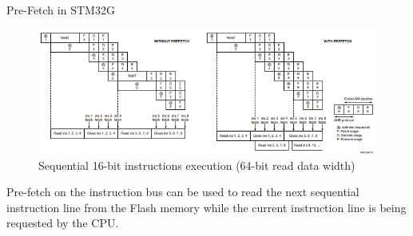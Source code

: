 \documentclass[
	11pt, %
]{beamer}
\begin{document}
\begin{frame}{Pre-Fetch in STM32G}
	\begin{figure}
		\includegraphics[scale=0.7]{images/prefetch32g.png}
		\caption{Sequential 16-bit instructions execution (64-bit read data width)}
	\end{figure}
	Pre-fetch on the instruction bus can be used to read the next sequential instruction line from the Flash memory while the current instruction line is being requested by the CPU. 
\end{frame}
\end{document}
